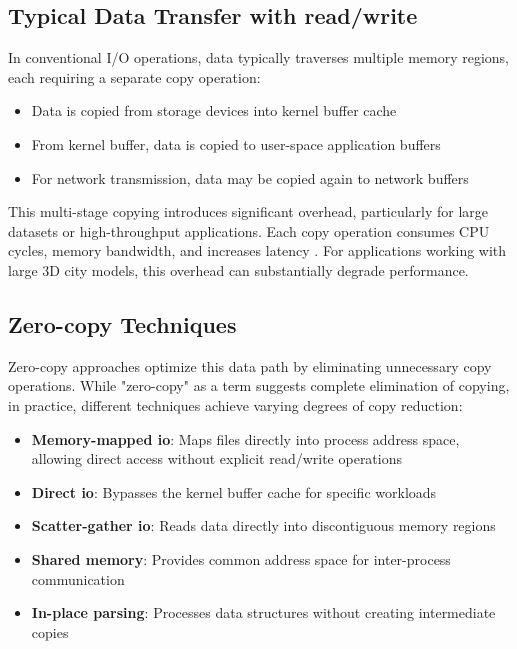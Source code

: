 \subsection{Typical Data Transfer with read/write}
In conventional I/O operations, data typically traverses multiple memory regions, each requiring a separate copy operation:

\begin{itemize}
  \item Data is copied from storage devices into kernel buffer cache
  \item From kernel buffer, data is copied to user-space application buffers
  \item For network transmission, data may be copied again to network buffers
\end{itemize}

This multi-stage copying introduces significant overhead, particularly for large datasets or high-throughput applications. Each copy operation consumes CPU cycles, memory bandwidth, and increases latency \citep{song2012performance}. For applications working with large 3D city models, this overhead can substantially degrade performance.

\subsection{Zero-copy Techniques}
\label{tb:zero_copy_techniques}
Zero-copy approaches optimize this data path by eliminating unnecessary copy operations. While "zero-copy" as a term suggests complete elimination of copying, in practice, different techniques achieve varying degrees of copy reduction:

\begin{itemize}
  \item \textbf{Memory-mapped \ac{io}}: Maps files directly into process address space, allowing direct access without explicit read/write operations
  \item \textbf{Direct \ac{io}}: Bypasses the kernel buffer cache for specific workloads
  \item \textbf{Scatter-gather \ac{io}}: Reads data directly into discontiguous memory regions
  \item \textbf{Shared memory}: Provides common address space for inter-process communication
  \item \textbf{In-place parsing}: Processes data structures without creating intermediate copies
\end{itemize}


